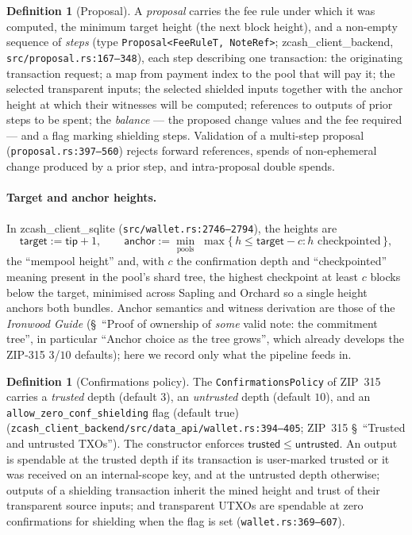 \documentclass[11pt,a4paper]{article}
\theoremstyle{definition}
\newtheorem{definition}[theorem]{Definition}
\begin{document}
\begin{definition}[Proposal]\label{def:proposal}
A \emph{proposal} carries the fee rule under which it was computed, the
minimum target height (the next block height), and a non-empty sequence of
\emph{steps} (type \texttt{Proposal<FeeRuleT, NoteRef>};
\textsf{zcash\_client\_backend}, \texttt{src/proposal.rs:167--348}), each
step describing one transaction: the originating transaction request; a map
from payment index to the pool that will pay it; the selected transparent
inputs; the selected shielded inputs together with the anchor height at which
their witnesses will
be computed; references to outputs of prior steps to be spent; the
\emph{balance} --- the proposed change values and the fee required --- and a
flag marking shielding steps. Validation of a multi-step proposal
(\texttt{proposal.rs:397--560}) rejects forward references, spends of
non-ephemeral change produced by a prior step, and intra-proposal double
spends.
\end{definition}

\paragraph{Target and anchor heights.} In \textsf{zcash\_client\_sqlite}
(\texttt{src/wallet.rs:2746--2794}), the heights are
\[
\mathsf{target} := \mathsf{tip} + 1, \qquad
\mathsf{anchor} := \min_{\text{pools}}\;
  \max\{\, h \le \mathsf{target} - c : h \text{ checkpointed} \,\},
\]
the ``mempool height'' and, with $c$ the confirmation depth and
``checkpointed'' meaning present in the pool's shard tree, the highest
checkpoint at least $c$ blocks below the target, minimised across Sapling
and Orchard so a single height anchors both bundles. Anchor semantics and
witness derivation are those of the \emph{Ironwood Guide} (\S~``Proof of
ownership of \emph{some} valid note: the commitment tree'', in particular
``Anchor choice
as the tree grows'', which already develops the ZIP-315 $3$/$10$ defaults);
here we record only what the pipeline feeds in.

\begin{definition}[Confirmations policy]\label{def:confpolicy}
The \texttt{ConfirmationsPolicy} of ZIP~315 carries a \emph{trusted} depth
(default $3$), an \emph{untrusted} depth (default $10$), and an
\texttt{allow\_zero\_conf\_shielding} flag (default true)
(\texttt{zcash\_client\_backend/src/data\_api/wallet.rs:394--405}; ZIP~315
\S~``Trusted and untrusted TXOs''). The constructor enforces
$\mathsf{trusted} \le \mathsf{untrusted}$. An output is spendable at the
trusted depth if its transaction is user-marked trusted or it was received on
an internal-scope key, and at the untrusted depth otherwise; outputs of a
shielding transaction inherit the mined height and trust of their transparent
source inputs; and transparent UTXOs are spendable at zero confirmations for
shielding when the flag is set (\texttt{wallet.rs:369--607}).
\end{definition}
\end{document}
